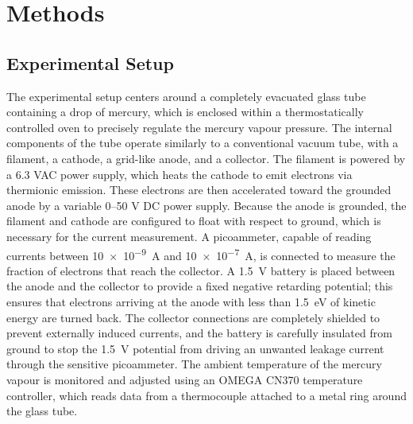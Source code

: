 \documentclass[11pt]{article}
\begin{document}
    \section{Methods}\label{sec:methods}

    \subsection*{Experimental Setup}
    The experimental setup centers around a completely evacuated glass tube
    containing a drop of mercury, which is enclosed within a thermostatically
    controlled oven to precisely regulate the mercury vapour pressure.
    The internal components of the tube operate similarly to a conventional
    vacuum tube, with a filament, a cathode, a grid-like anode, and a
    collector.
    The filament is powered by a 6.3 VAC power supply, which heats the cathode
    to emit electrons via thermionic emission.
    These electrons are then accelerated toward the grounded anode by a
    variable 0--50 V DC power supply.
    Because the anode is grounded, the filament and cathode are configured to
    float with respect to ground, which is necessary for the current
    measurement.
    A picoammeter, capable of reading currents between \SI{10e-9}{\ampere} and
    \SI{10e-7}{\ampere}, is connected to measure the fraction of electrons
    that reach the collector.
    A \SI{1.5}{\volt} battery is placed between the anode and the collector to
    provide a fixed negative retarding potential; this ensures that electrons
    arriving at the anode with less than \SI{1.5}{\electronvolt} of kinetic
    energy are turned back.
    The collector connections are completely shielded to prevent externally
    induced currents, and the battery is carefully insulated from ground to
    stop the \SI{1.5}{\volt} potential from driving an unwanted leakage
    current through the sensitive picoammeter.
    The ambient temperature of the mercury vapour is monitored and adjusted
    using an OMEGA CN370 temperature controller, which reads data from a
    thermocouple attached to a metal ring around the glass tube.
\end{document}
